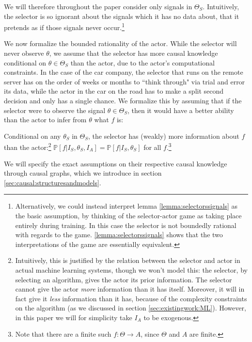 We will therefore throughout the paper consider only signals in $\Theta_S$. Intuitively, the selector is so ignorant about the signals which it has no data about, that it pretends as if those signals never occur.\footnote{Alternatively, we could instead interpret lemma \ref{lemma:selectorssignals} as the basic assumption, by thinking of the selector-actor game as taking place entirely during training. In this case the selector is not boundedly rational with regards to the game. \ref{lemma:selectorssignals} shows that the two interpretations of the game are essentially equivalent.}

We now formalize the bounded rationality of the actor. While the selector will never observe $\theta$, we assume that the selector has more causal knowledge conditional on $\theta\in \Theta_S$ than the actor, due to the actor's computational constraints. In the case of the car company, the selector that runs on the remote server has on the order of weeks or months to ``think through" via trial and error its data, while the actor in the car on the road has to make a split second decision and only has a single chance. We formalize this by assuming that if the selector were to observe the signal $\theta\in \Theta_S$, then it would have a better ability than the actor to infer from $\theta$ what $f$ is:

\begin{assumption*}
	Conditional on any $\theta_S$ in $\Theta_S$, the selector has (weakly) more information about $f$ than the actor:\footnote{Intuitively, this is justified by the relation between the selector and actor in actual machine learning systems, though we won't model this: the selector, by selecting an algorithm, gives the actor its prior information. The selector cannot give the actor \textit{more} information than it has itself. Moreover, it will in fact give it \textit{less} information than it has, because of the complexity constraints on the algorithm (as we discussed in section \ref{sec:existingwork:ML}). However, in this paper we will for simplicity take $I_A$ to be exogenous.} $\mathbb P[f|I_S,\theta_S,I_A]=\mathbb P[f|I_S,\theta_S]$ for all $f$.\footnote{Note that there are a finite such $f\colon \Theta \to A$, since $\Theta$ and $A$ are finite. }
\end{assumption*}

We will specify the exact assumptions on their respective causal knowledge through causal graphs, which we introduce in section \ref{sec:causal:structuresandmodels}.

